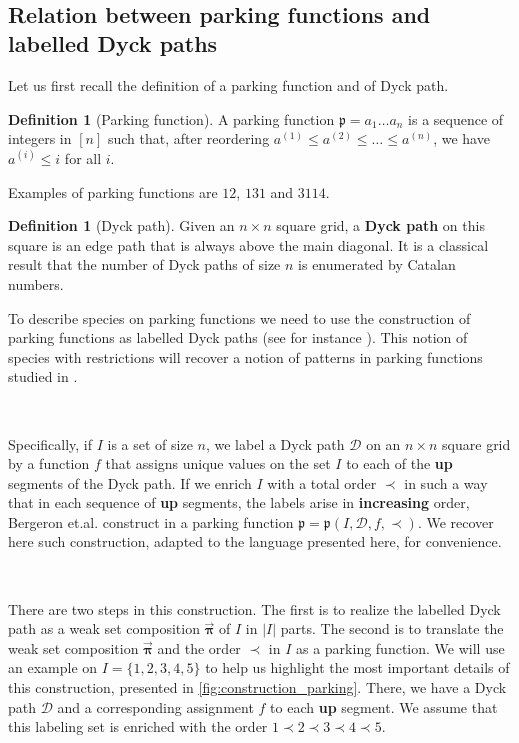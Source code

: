 \documentclass[12pt, reqno]{amsart}
\theoremstyle{definition}
\newtheorem{defin}[thm]{Definition}
\newcommand{\opi}{\vec{\boldsymbol{\pi}}}
\begin{document}
\

\subsection{Relation between parking functions and labelled Dyck paths}

Let us first recall the definition of a parking function and of  Dyck path.

\begin{defin}[Parking function]
A parking function $\mathfrak{p} = a_1 \dots a_n$ is a sequence of integers in $[n]$ such that, after reordering $a^{(1)} \leq a^{(2)} \leq \dots \leq a^{(n)}$, we have $a^{(i)} \leq i$ for all $i$.
\end{defin}

Examples of parking functions are $12$, $131$ and $3114$.

\begin{defin}[Dyck path]
Given an $n\times n$ square grid, a \textbf{Dyck path} on this square is an edge path that is always above the main diagonal.
It is a classical result that the number of Dyck paths of size $n$ is enumerated by Catalan numbers.
\end{defin}


To describe species on parking functions we need to use the construction of parking functions as labelled Dyck paths (see for instance \cite{Loehr}).
This notion of species with restrictions will recover a notion of patterns in parking functions studied in \cite{adeniran2022pattern}.

\

Specifically, if $I$ is a set of size $n$, we label a Dyck path $\mathcal D$ on an $n\times n$ square grid by a function $f$ that assigns unique values on the set $I$ to each of the \textbf{up} segments of the Dyck path.
If we enrich $I$ with a total order $\prec$ in such a way that in each sequence of \textbf{up} segments, the labels arise in \textbf{increasing} order, Bergeron et.al. construct in \cite{BGLPV2021} a parking function $\mathfrak{p} = \mathfrak{p}(I, \mathcal D, f, \prec) $.
We recover here such construction, adapted to the language presented here, for convenience.

\

There are two steps in this construction.
The first is to realize the labelled Dyck path as a weak set composition $\opi$ of $I$ in $|I|$ parts. The second is to translate the weak set composition $\opi$ and the order $\prec $ in $I$ as a parking function.
We will use an example on $I = \{1, 2, 3, 4, 5\}$ to help us highlight the most important details of this construction, presented in \cref{fig:construction_parking}.
There, we have a Dyck path $\mathcal D$ and a corresponding assignment $f$ to each \textbf{up} segment.
We assume that this labeling set is enriched with the order $1 \prec 2 \prec 3 \prec 4 \prec 5$.
\end{document}
